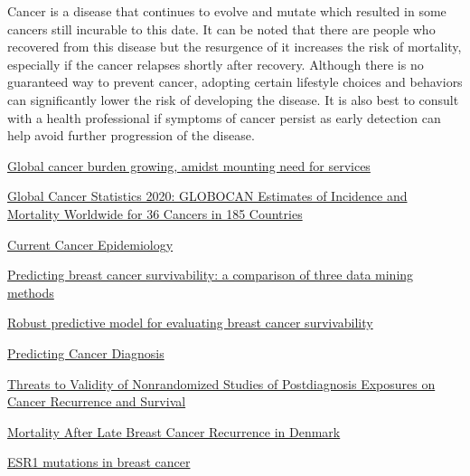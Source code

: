\documentclass[11pt,singlespace]{article}
\begin{document}
	Cancer is a disease that continues to evolve and mutate which resulted in some cancers still incurable to this date. It can be noted that there are people who recovered from this disease but the resurgence of it increases the risk of mortality, especially if the cancer relapses shortly after recovery. Although there is no guaranteed way to prevent cancer, adopting certain lifestyle choices and behaviors can significantly lower the risk of developing the disease. It is also best to consult with a health professional if symptoms of cancer persist as early detection can help avoid further progression of the disease.
	
	\begin{thebibliography}{10}
		\href{https://www.who.int/news/item/01-02-2024-global-cancer-burden-growing--amidst-mounting-need-for-services}{Global cancer burden growing, amidst mounting need for services}
		\label{WHO Statistics}
		
		\href{https://acsjournals.onlinelibrary.wiley.com/doi/full/10.3322/caac.21660}{Global Cancer Statistics 2020: GLOBOCAN Estimates of Incidence and Mortality Worldwide for 36 Cancers in 185 Countries}
		\label{Cancer Diagnosis Stats}
		
		\href{https://link.springer.com/article/10.2991/jegh.k.191008.001}{Current Cancer Epidemiology}
		\label{Cancer Epidemiology}
		
		\href{https://www.sciencedirect.com/science/article/abs/pii/S0933365704001010}{Predicting breast cancer survivability: a comparison of three data mining methods}
		\label{Predicting Breast Cancer Survivability}
		
		\href{https://www.sciencedirect.com/science/article/abs/pii/S0952197613001140}{Robust predictive model for evaluating breast cancer survivability}
		\label{Robust predictive model for evaluating breast cancer survivability}
		
		\href{https://www.kaggle.com/competitions/mubravo/data}{Predicting Cancer Diagnosis}
		\label{Predicting Cancer Diagnosis}
		
		\href{https://academic.oup.com/jnci/article/105/19/1456/1000266?login=true}{Threats to Validity of Nonrandomized Studies of Postdiagnosis Exposures on Cancer Recurrence and Survival}
		\label{Cancer Recurrence}
		
		\href{https://www.ingentaconnect.com/content/wk/jco/2022/00000040/00000013/art00008}{Mortality After Late Breast Cancer Recurrence in Denmark}
		\label{Mortality Rate}
		
		\href{https://acsjournals.onlinelibrary.wiley.com/doi/full/10.1002/cncr.32345}{ESR1 mutations in breast cancer}
		\label{ESR1 Mutation in Breast Cancer}
		
		
	\end{thebibliography}

	
	
	
	
	
	
	
\end{document}
